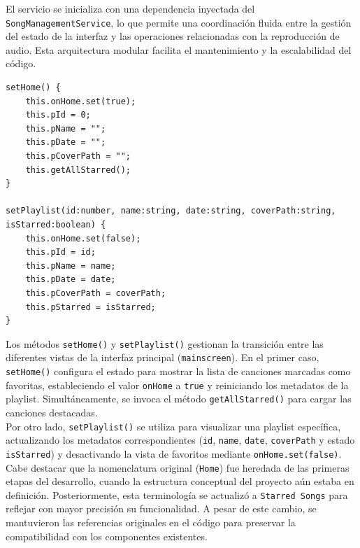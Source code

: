 \documentclass[11pt, a4paper]{article}
\begin{document}
                El servicio se inicializa con una dependencia inyectada del \\ \texttt{SongManagementService}, lo que permite una coordinación fluida entre la gestión del estado de la interfaz y las operaciones relacionadas con la reproducción de audio. Esta arquitectura modular facilita el mantenimiento y la escalabilidad del código. \\


                \begin{lstlisting}[caption={setHome() y setPlaylist()}]
setHome() {
    this.onHome.set(true);
    this.pId = 0;
    this.pName = "";
    this.pDate = "";
    this.pCoverPath = "";
    this.getAllStarred();
}

setPlaylist(id:number, name:string, date:string, coverPath:string, isStarred:boolean) {
    this.onHome.set(false);
    this.pId = id;
    this.pName = name;
    this.pDate = date;
    this.pCoverPath = coverPath;
    this.pStarred = isStarred;
}
                \end{lstlisting}

                Los métodos \texttt{setHome()} y \texttt{setPlaylist()} gestionan la transición entre las diferentes vistas de la interfaz principal (\texttt{mainscreen}). En el primer caso, \texttt{setHome()} configura el estado para mostrar la lista de canciones marcadas como favoritas, estableciendo el valor \texttt{onHome} a \texttt{true} y reiniciando los metadatos de la playlist. Simultáneamente, se invoca el método \texttt{getAllStarred()} para cargar las canciones destacadas. \\

                Por otro lado, \texttt{setPlaylist()} se utiliza para visualizar una playlist específica, actualizando los metadatos correspondientes (\texttt{id}, \texttt{name}, \texttt{date}, \texttt{coverPath} y estado \texttt{isStarred}) y desactivando la vista de favoritos mediante \texttt{onHome.set(false)}. \\

                Cabe destacar que la nomenclatura original (\texttt{Home}) fue heredada de las primeras etapas del desarrollo, cuando la estructura conceptual del proyecto aún estaba en definición. Posteriormente, esta terminología se actualizó a \texttt{Starred Songs} para reflejar con mayor precisión su funcionalidad. A pesar de este cambio, se mantuvieron las referencias originales en el código para preservar la compatibilidad con los componentes existentes. \\
\end{document}
